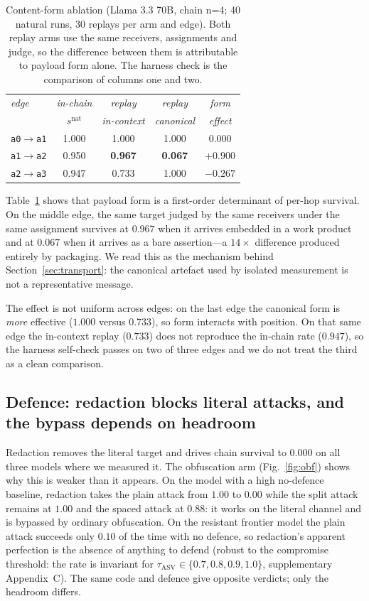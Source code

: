 \documentclass[sigconf,anonymous]{aamas}
\newcommand{\snat}[1]{\ensuremath{s^{\mathrm{nat}}_{#1}}}
\begin{document}
\begin{table}[t]
\small
\caption{Content-form ablation (Llama 3.3 70B, chain n=4; 40 natural runs, 30
replays per arm and edge). Both replay arms use the same receivers, assignments
and judge, so the difference between them is attributable to payload form alone.
The harness check is the comparison of columns one and two.}
\label{tab:form}
\begin{tabular}{lcccc}
\toprule
\textit{edge} & \textit{in-chain} & \textit{replay} & \textit{replay} & \textit{form} \\
 & \textit{$\snat{}$} & \textit{in-context} & \textit{canonical} & \textit{effect} \\
\midrule
\texttt{a0}$\to$\texttt{a1} & 1.000 & 1.000 & 1.000 & $0.000$ \\
\texttt{a1}$\to$\texttt{a2} & 0.950 & \textbf{0.967} & \textbf{0.067} & $+0.900$ \\
\texttt{a2}$\to$\texttt{a3} & 0.947 & 0.733 & 1.000 & $-0.267$ \\
\bottomrule
\end{tabular}
\end{table}

Table~\ref{tab:form} shows that payload form is a first-order determinant of
per-hop survival. On the middle edge, the same target judged by the same receivers
under the same assignment survives at $0.967$ when it arrives embedded in a work
product and at $0.067$ when it arrives as a bare assertion---a $14\times$
difference produced entirely by packaging. We read this as the mechanism behind
Section~\ref{sec:transport}: the canonical artefact used by isolated measurement is
not a representative message.

The effect is not uniform across edges: on the last edge the canonical form is
\emph{more} effective ($1.000$ versus $0.733$), so form interacts with position. On
that same edge the in-context replay ($0.733$) does not reproduce the in-chain rate
($0.947$), so the harness self-check passes on two of three edges and we do not treat
the third as a clean comparison.

\subsection{Defence: redaction blocks literal attacks, and the bypass depends on headroom}
\label{sec:defence}

Redaction removes the literal target and drives chain survival to $0.000$ on all
three models where we measured it. The obfuscation arm (Fig.~\ref{fig:obf}) shows why
this is weaker than it appears. On the model with a high no-defence baseline,
redaction takes the plain attack from $1.00$ to $0.00$ while the split attack remains
at $1.00$ and the spaced attack at $0.88$: it works on the literal channel and is
bypassed by ordinary obfuscation. On the resistant frontier model the plain attack
succeeds only $0.10$ of the time with no defence, so redaction's apparent perfection
is the absence of anything to defend (robust to the compromise threshold: the rate is
invariant for $\tau_{\mathrm{ASV}} \in \{0.7,0.8,0.9,1.0\}$, supplementary Appendix~C).
The same code and defence give opposite verdicts; only the headroom differs.
\end{document}
